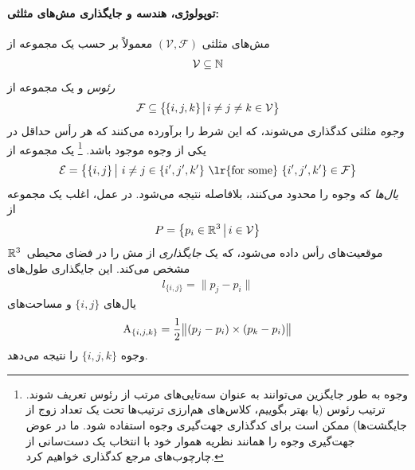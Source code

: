\paragraph{توپولوژی، هندسه و جایگذاری مش‌های مثلثی:}
مش‌های مثلثی $(\mathcal{V},\mathcal{F})$ معمولاً بر حسب یک مجموعه از
\begin{align}
    \mathcal{V}\subseteq\mathbb{N}
\end{align}
\emph{رئوس} و یک مجموعه از
\begin{align}
    {\mathcal{F} \subseteq \big\{\mkern-2mu \{i,j,k\} \mkern2mu\big|\mkern2mu i\neq j\neq k \in\mathcal{V} \big\}}
\end{align}
\emph{وجوه} مثلثی کدگذاری می‌شوند،
که این شرط را برآورده می‌کنند که هر رأس حداقل در یکی از وجوه موجود باشد.%
\footnote{
    وجوه به طور جایگزین می‌توانند به عنوان سه‌تایی‌های مرتب از رئوس تعریف شوند.
    ترتیب رئوس (یا بهتر بگوییم، کلاس‌های هم‌ارزی ترتیب‌ها تحت یک تعداد زوج از جایگشت‌ها) ممکن است برای کدگذاری جهت‌گیری وجوه استفاده شود.
    ما در عوض جهت‌گیری وجوه را همانند نظریه هموار خود با انتخاب یک دست‌سانی از چارچوب‌های مرجع کدگذاری خواهیم کرد.
}
یک مجموعه از
\begin{align}
    \mathcal{E} = \big\{ \{i,j\} \,\big|\ i\neq j\in \{i',j',k'\} \textup{ \lr{for some} } \{i',j',k'\} \in \mathcal{F} \big\}
\end{align}
\emph{یال‌ها} که وجوه را محدود می‌کنند، بلافاصله نتیجه می‌شود.
در عمل، اغلب یک مجموعه از
\begin{align}
    P = \big\{ p_i \in \mathbb{R}^3 \,\big|\, i\in\mathcal{V} \big\}
\end{align}
موقعیت‌های رأس داده می‌شود، که یک \emph{جایگذاری} از مش را در فضای محیطی~$\mathbb{R}^3$ مشخص می‌کند.
این جایگذاری طول‌های
\begin{align}
    l_{\{i,j\}} = \lVert p_j-p_i \rVert
\end{align}
یال‌های $\{i,j\}$ و مساحت‌های
\begin{align}
    \textup{A}_{\{i,j,k\}} = \frac{1}{2} \big\lVert {(p_j-p_i)} \times (p_k-p_i) \big\rVert
\end{align}
وجوه $\{i,j,k\}$ را نتیجه می‌دهد.


